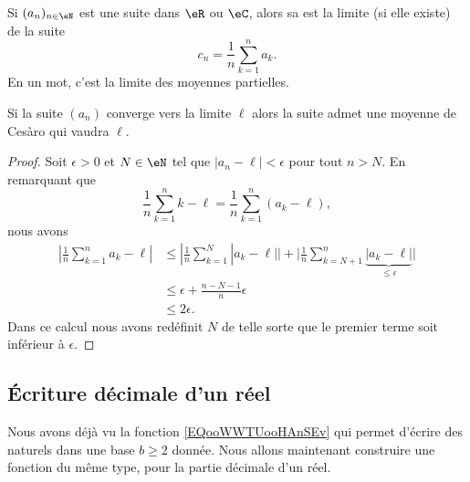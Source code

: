 \begin{definition}
    Si \( (a_n)_{n\in \eN} \) est une suite dans \( \eR\) ou \( \eC\), alors sa  est la limite (si elle existe) de la suite
    \begin{equation}
        c_n=\frac{1}{ n }\sum_{k=1}^na_k.
    \end{equation}
    En un mot, c'est la limite des moyennes partielles.
\end{definition}

\begin{lemma}       \label{LemyGjMqM}
    Si la suite \( (a_n)\) converge vers la limite \( \ell\) alors la suite admet une moyenne de Cesàro qui vaudra \( \ell\).
\end{lemma}

\begin{proof}
    Soit \( \epsilon>0\) et \( N\in \eN\) tel que \( | a_n-\ell |<\epsilon\) pour tout \( n>N\). En remarquant que
    \begin{equation}
        \frac{1}{ n }\sum_{k=1}^nk-\ell=\frac{1}{ n }\sum_{k=1}^n(a_k-\ell),
    \end{equation}
    nous avons
    \begin{subequations}
        \begin{align}
            | \frac{1}{ n }\sum_{k=1}^na_k-\ell |&\leq| \frac{1}{ n }\sum_{k=1}^N| a_k-\ell | |+\big| \frac{1}{ n }\sum_{k=N+1}^n\underbrace{| a_k-\ell |}_{\leq \epsilon} \big|\\
            &\leq \epsilon+\frac{ n-N-1 }{ n }\epsilon\\
            &\leq 2\epsilon.
        \end{align}
    \end{subequations}
    Dans ce calcul nous avons redéfinit \( N\) de telle sorte que le premier terme soit inférieur à \( \epsilon\).
\end{proof}

\subsection{Écriture décimale d'un réel}

Nous avons déjà vu la fonction \eqref{EQooWWTUooHAnSEv} qui permet d'écrire des naturels dans une base \( b\geq 2\) donnée. Nous allons maintenant construire une fonction du même type, pour la partie décimale d'un réel.

